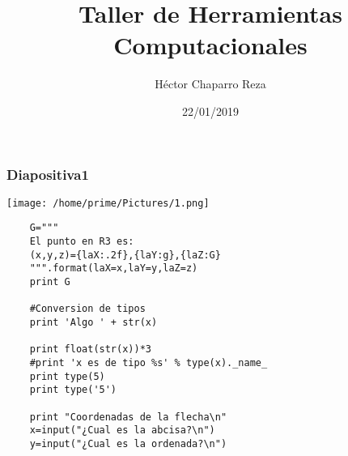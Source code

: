 \documentclass{beamer}
\title{Taller de Herramientas Computacionales}
\author{Héctor Chaparro Reza}
\date{22/01/2019}
\begin{document}
\begin{frame}
\frametitle{Diapositiva1}
\begin{center}
	\texttt{[image: /home/prime/Pictures/1.png]}
\end{center}
\end{frame}

\begin{frame}[fragile]
	\begin{verbatim}
	G="""
	El punto en R3 es:
	(x,y,z)={laX:.2f},{laY:g},{laZ:G} 
	""".format(laX=x,laY=y,laZ=z)
	print G
	
	#Conversion de tipos
	print 'Algo ' + str(x)
	
	print float(str(x))*3
	#print 'x es de tipo %s' % type(x)._name_
	print type(5)
	print type('5')
	
	print "Coordenadas de la flecha\n"
	x=input("¿Cual es la abcisa?\n")
	y=input("¿Cual es la ordenada?\n")	
	\end{verbatim}
\end{frame}
	
\end{document}
